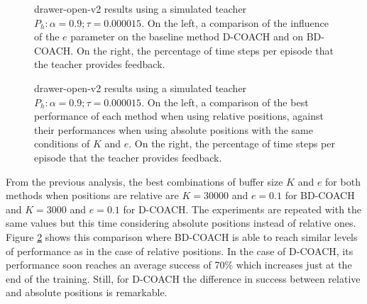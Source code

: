  \begin{figure}[H]
  \centering
   \hfill
  \caption{drawer-open-v2 results using a simulated teacher $P_h: \alpha = 0.9; \tau =  0.000015$. On the left, a comparison of the influence of the $e$ parameter on the baseline method D-COACH and on BD-COACH. On the right, the percentage of time steps per episode that the teacher  provides feedback.}
  \label{fig:results_drawer-open-same-buffer}
\end{figure}





 \begin{figure}[H]
  \centering
  \caption{drawer-open-v2 results using a simulated teacher $P_h: \alpha = 0.9; \tau =  0.000015$. On the left, a comparison of the best performance of each method when using relative positions, against their performances when using absolute positions with the same conditions of $K$ and $e$. On the right, the percentage of time steps per episode that the teacher  provides feedback.}
  \label{fig:results_drawer-open-best}
\end{figure}





From the previous analysis, the best combinations of buffer size $K$ and $e$ for both methods when positions are relative are $K=30000$ and $e=0.1$ for BD-COACH and $K=3000$ and $e=0.1$ for D-COACH. The experiments are repeated with the same values but this time considering absolute positions instead of relative ones. Figure \ref{fig:results_drawer-open-best}  shows this comparison where BD-COACH is able to reach similar levels of performance as in the case of relative positions. In the case of D-COACH, its performance soon reaches an average success of 70\% which increases just at the end of the training. Still, for D-COACH the difference in success between relative and absolute positions is remarkable.


